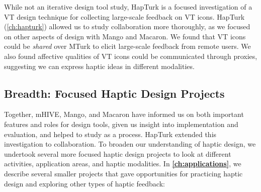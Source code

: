 	While not an iterative design tool study, HapTurk is a focused investigation of a VT design technique for collecting large-scale feedback on VT icons.
	HapTurk (\autoref{ch:hapturk}) allowed us to study collaboration more thoroughly, as we focused on other aspects of design with Mango and Macaron. We found that VT icons could be \emph{shared} over MTurk to elicit large-scale feedback from remote users. We also found affective qualities of VT icons could be communicated through proxies, suggesting we can express haptic ideas in different modalities.


\subsection{Breadth: Focused Haptic Design Projects}
\label{ch:conclusion:approach:breadth}
Together, mHIVE, Mango, and Macaron have informed us on both important features and roles for design tools, given us insight into implementation and evaluation, and helped to study \haxd as a process.
HapTurk extended this investigation to collaboration.
To broaden our understanding of haptic design, we undertook several more focused haptic design projects to look at different activities, application areas, and haptic modalities.
In \textbf{\autoref{ch:applications}}, we describe several smaller projects that gave opportunities for practicing haptic design and exploring other types of haptic feedback:

